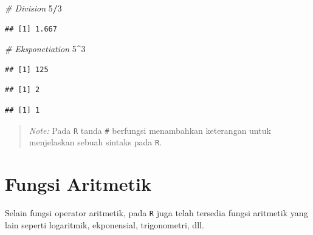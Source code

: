 \documentclass[]{book}
\newenvironment{Shaded}{\begin{snugshade}}{\end{snugshade}}
\newcommand{\DecValTok}[1]{\textcolor[rgb]{0.00,0.00,0.81}{#1}}
\newcommand{\CommentTok}[1]{\textcolor[rgb]{0.56,0.35,0.01}{\textit{#1}}}
\newcommand{\OperatorTok}[1]{\textcolor[rgb]{0.81,0.36,0.00}{\textbf{#1}}}
\begin{document}
\begin{Shaded}
\begin{Highlighting}[]
\CommentTok{# Division}
\DecValTok{5}\OperatorTok{/}\DecValTok{3}
\end{Highlighting}
\end{Shaded}

\begin{verbatim}
## [1] 1.667
\end{verbatim}

\begin{Shaded}
\begin{Highlighting}[]
\CommentTok{# Eksponetiation}
\DecValTok{5}\OperatorTok{^}\DecValTok{3}
\end{Highlighting}
\end{Shaded}

\begin{verbatim}
## [1] 125
\end{verbatim}

\begin{Shaded}
\end{Shaded}

\begin{verbatim}
## [1] 2
\end{verbatim}

\begin{Shaded}
\end{Shaded}

\begin{verbatim}
## [1] 1
\end{verbatim}

\begin{quote}
\emph{Note: } Pada \texttt{R} tanda \texttt{\#} berfungsi menambahkan
keterangan untuk menjelaskan sebuah sintaks pada \texttt{R}.
\end{quote}

\section{Fungsi Aritmetik}\label{fungsi-aritmetik}

Selain fungsi operator aritmetik, pada \texttt{R} juga telah tersedia
fungsi aritmetik yang lain seperti logaritmik, ekponensial,
trigonometri, dll.
\end{document}
